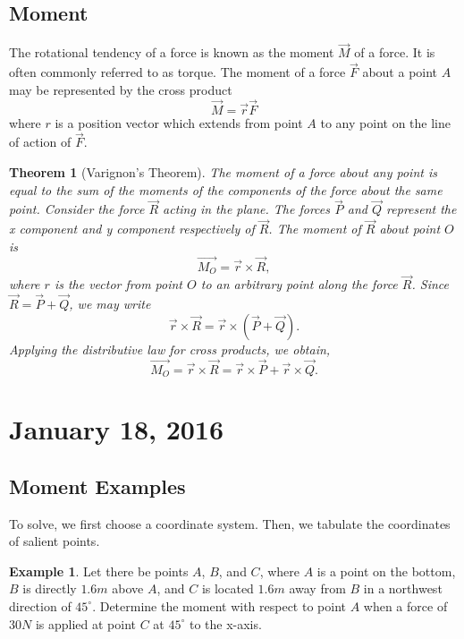 \documentclass[11pt]{article}
\theoremstyle{plain} %
\newtheorem*{theorem}{Theorem}
\theoremstyle{definition}
\theoremstyle{example}
\newtheorem*{example}{Example}
\theoremstyle{remark}
\begin{document}
\subsection{Moment}

The rotational tendency of a force is known as the moment $\vec{M}$ of a force. It is often commonly referred to as torque. The moment of a force $\vec{F}$ about a point $A$ may be represented by the cross product
$$\vec{M} = \vec{r}\vec{F}$$
where $r$ is a position vector which extends from point $A$ to any point on the line of action of $\vec{F}$. 

\begin{theorem}[Varignon's Theorem]
The moment of a force about any point is equal to the sum of the moments of the components of the force about the same point. Consider the force $\vec{R}$ acting in the plane. The forces $\vec{P}$ and $\vec{Q}$ represent the x component and y component respectively of $\vec{R}$. The moment of $\vec{R}$ about point $O$ is 
$$\vec{M_O} = \vec{r}\times \vec{R},$$
where $r$ is the vector from point $O$ to an arbitrary point along the force $\vec{R}$. Since $\vec{R} = \vec{P} + \vec{Q}$, we may write 
$$\vec{r} \times \vec{R} = \vec{r} \times(\vec{P}+\vec{Q}).$$
Applying the distributive law for cross products, we obtain,
$$\vec{M_O} = \vec{r}\times \vec{R} =\vec{ r} \times \vec{P} + \vec{r} \times \vec{Q}.$$

\end{theorem}


\section{January 18, 2016}
\subsection{Moment Examples}

To solve, we first choose a coordinate system. Then, we tabulate the coordinates of salient points. 

\begin{example}
Let there be points $A$, $B$, and $C$, where $A$ is a point on the bottom, $B$ is directly $1.6m$ above $A$, and $C$ is located $1.6m$ away from $B$ in a northwest direction of $45^{\circ}$. Determine the moment with respect to point $A$ when a force of $30N$ is applied at point $C$ at $45^{\circ}$ to the x-axis. 
\end{example}
\end{document}
